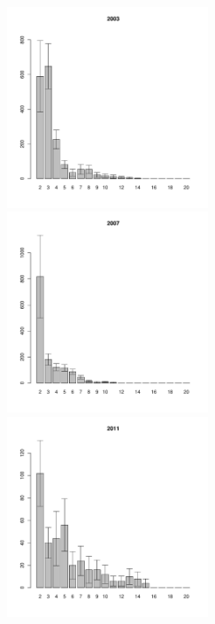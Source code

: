 \documentclass[12pt, a4paper]{article}
\begin{document}
\begin{figure}[h]
\begin{multicols}{3}
\hfill
\includegraphics[width=60mm]{../White_Sea/Ryashkov_YuG/YuG2_2003_.pdf}
\hfill
\includegraphics[width=60mm]{../White_Sea/Ryashkov_YuG/YuG2_2007_.pdf}
\hfill
\includegraphics[width=60mm]{../White_Sea/Ryashkov_YuG/YuG2_2011_.pdf}
\end{multicols}



\end{figure}
\end{document}

